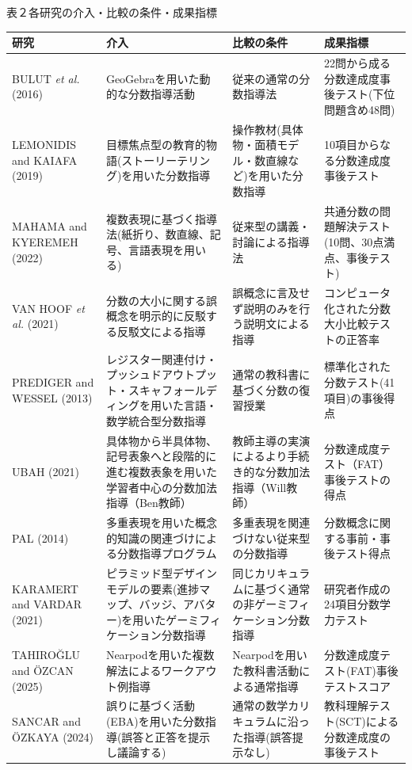 \documentclass[
  lualatex, ja=standard, paper={182mm,257mm}, twocolumn, fontsize=8.5pt, baselineskip=13.5pt,
  line_length=24zw, column_gap=6.1mm, number_of_lines=45, head_space=24.5mm, gutter=16.25mm
]{jlreq}
\newcommand{\tablefont}{\fontsize{7.5pt}{10.5pt}\selectfont}
\begin{document}
\begin{table}[tb]
\centering
{\tablefont \gtfamily 表２\hspace{1em}各研究の介入・比較の条件・成果指標\par}\vspace{2pt}
{\tablefont\renewcommand{\arraystretch}{1.12}
\begin{tabular}{>{\raggedright\arraybackslash}p{0.2000\dimexpr\textwidth-8\tabcolsep\relax}>{\raggedright\arraybackslash}p{0.3200\dimexpr\textwidth-8\tabcolsep\relax}>{\raggedright\arraybackslash}p{0.2400\dimexpr\textwidth-8\tabcolsep\relax}>{\raggedright\arraybackslash}p{0.2400\dimexpr\textwidth-8\tabcolsep\relax}}
\toprule
研究 & 介入 & 比較の条件 & 成果指標 \\
\midrule
BULUT \textit{et al.} (2016) & GeoGebraを用いた動的な分数指導活動 & 従来の通常の分数指導法 & 22問から成る分数達成度事後テスト(下位問題含め48問) \\
LEMONIDIS and KAIAFA (2019) & 目標焦点型の教育的物語(ストーリーテリング)を用いた分数指導 & 操作教材(具体物・面積モデル・数直線など)を用いた分数指導 & 10項目からなる分数達成度事後テスト \\
MAHAMA and KYEREMEH (2022) & 複数表現に基づく指導法(紙折り、数直線、記号、言語表現を用いる) & 従来型の講義・討論による指導法 & 共通分数の問題解決テスト(10問、30点満点、事後テスト) \\
VAN HOOF \textit{et al.} (2021) & 分数の大小に関する誤概念を明示的に反駁する反駁文による指導 & 誤概念に言及せず説明のみを行う説明文による指導 & コンピュータ化された分数大小比較テストの正答率 \\
PREDIGER and WESSEL (2013) & レジスター関連付け・プッシュドアウトプット・スキャフォールディングを用いた言語・数学統合型分数指導 & 通常の教科書に基づく分数の復習授業 & 標準化された分数テスト(41項目)の事後得点 \\
UBAH (2021) & 具体物から半具体物、記号表象へと段階的に進む複数表象を用いた学習者中心の分数加法指導（Ben教師） & 教師主導の実演によるより手続き的な分数加法指導（Will教師） & 分数達成度テスト（FAT）事後テストの得点 \\
PAL (2014) & 多重表現を用いた概念的知識の関連づけによる分数指導プログラム & 多重表現を関連づけない従来型の分数指導 & 分数概念に関する事前・事後テスト得点 \\
KARAMERT and VARDAR (2021) & ピラミッド型デザインモデルの要素(進捗マップ、バッジ、アバター)を用いたゲーミフィケーション分数指導 & 同じカリキュラムに基づく通常の非ゲーミフィケーション分数指導 & 研究者作成の24項目分数学力テスト \\
TAHIROĞLU and ÖZCAN (2025) & Nearpodを用いた複数解法によるワークアウト例指導 & Nearpodを用いた教科書活動による通常指導 & 分数達成度テスト(FAT)事後テストスコア \\
SANCAR and ÖZKAYA (2024) & 誤りに基づく活動(EBA)を用いた分数指導(誤答と正答を提示し議論する) & 通常の数学カリキュラムに沿った指導(誤答提示なし) & 教科理解テスト(SCT)による分数達成度の事後テスト \\
\bottomrule
\end{tabular}\par}
\vspace{2pt}{\tablefont\noindent 注：論文の本文から自動で抽出し，要約した．\par}
\end{table}
\end{document}
